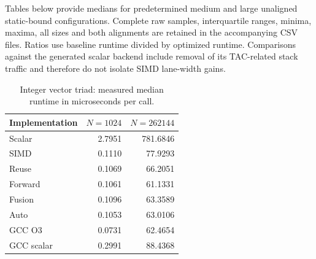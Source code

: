 Tables below provide medians for predetermined medium and large unaligned static-bound configurations. Complete raw samples, interquartile ranges, minima, maxima, all sizes and both alignments are retained in the accompanying CSV files. Ratios use baseline runtime divided by optimized runtime. Comparisons against the generated scalar backend include removal of its TAC-related stack traffic and therefore do not isolate SIMD lane-width gains.

\begin{table}[htbp]\centering\small

\caption{Integer vector triad: measured median runtime in microseconds per call.}

\begin{tabular}{lrr}\toprule

Implementation & $N=1024$ & $N=262144$ \\

\midrule

Scalar & 2.7951 & 781.6846 \\

SIMD & 0.1110 & 77.9293 \\

Reuse & 0.1069 & 66.2051 \\

Forward & 0.1061 & 61.1331 \\

Fusion & 0.1096 & 63.3589 \\

Auto & 0.1053 & 63.0106 \\

GCC O3 & 0.0731 & 62.4654 \\

GCC scalar & 0.2991 & 88.4368 \\

\bottomrule\end{tabular}\end{table}

